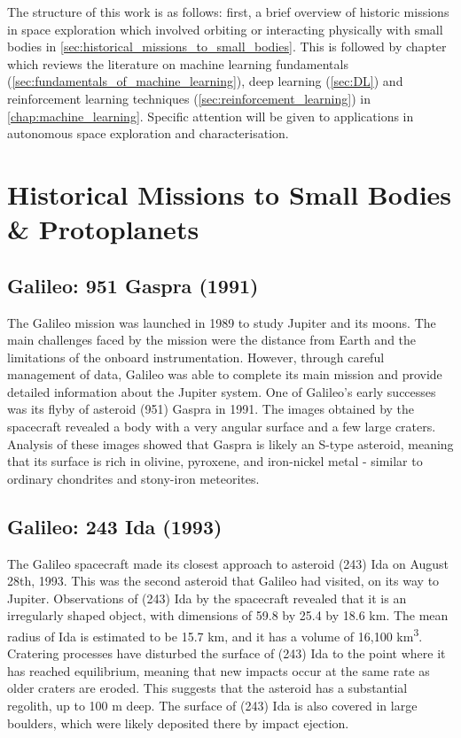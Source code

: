 The structure of this work is as follows: first, a brief overview of historic missions in space exploration which involved orbiting or interacting physically with small bodies in \autoref{sec:historical_missions_to_small_bodies}. This is followed by chapter which reviews the literature on machine learning fundamentals (\autoref{sec:fundamentals_of_machine_learning}), deep learning (\autoref{sec:DL}) and reinforcement learning techniques (\autoref{sec:reinforcement_learning}) in \autoref{chap:machine_learning}. Specific attention will be given to applications in autonomous space exploration and characterisation.

\section{Historical Missions to Small Bodies \& Protoplanets}\label{sec:historical_missions_to_small_bodies}

\subsection{Galileo: 951 Gaspra (1991)}

The Galileo mission was launched in 1989 to study Jupiter and its moons. The main challenges faced by the mission were the distance from Earth and the limitations of the onboard instrumentation. However, through careful management of data, Galileo was able to complete its main mission and provide detailed information about the Jupiter system. One of Galileo's early successes was its flyby of asteroid (951) Gaspra in 1991. The images obtained by the spacecraft revealed a body with a very angular surface and a few large craters. Analysis of these images showed that Gaspra is likely an S-type asteroid, meaning that its surface is rich in olivine, pyroxene, and iron-nickel metal - similar to ordinary chondrites and stony-iron meteorites.

\subsection{Galileo: 243 Ida (1993)}

The Galileo spacecraft made its closest approach to asteroid (243) Ida on August 28th, 1993. This was the second asteroid that Galileo had visited, on its way to Jupiter. Observations of (243) Ida by the spacecraft revealed that it is an irregularly shaped object, with dimensions of 59.8 by 25.4 by 18.6 km. The mean radius of Ida is estimated to be 15.7 km, and it has a volume of 16,100 km\textsuperscript{3}. Cratering processes have disturbed the surface of (243) Ida to the point where it has reached equilibrium, meaning that new impacts occur at the same rate as older craters are eroded. This suggests that the asteroid has a substantial regolith, up to 100 m deep. The surface of (243) Ida is also covered in large boulders, which were likely deposited there by impact ejection.

